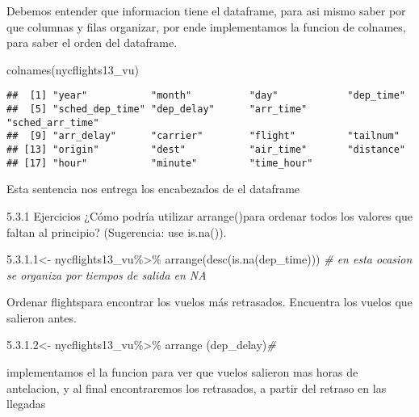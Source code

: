 \documentclass[
]{article}
\newenvironment{Shaded}{\begin{snugshade}}{\end{snugshade}}
\newcommand{\CommentTok}[1]{\textcolor[rgb]{0.56,0.35,0.01}{\textit{#1}}}
\newcommand{\FunctionTok}[1]{\textcolor[rgb]{0.00,0.00,0.00}{#1}}
\newcommand{\NormalTok}[1]{#1}
\newcommand{\OtherTok}[1]{\textcolor[rgb]{0.56,0.35,0.01}{#1}}
\newcommand{\SpecialCharTok}[1]{\textcolor[rgb]{0.00,0.00,0.00}{#1}}
\newcommand{\StringTok}[1]{\textcolor[rgb]{0.31,0.60,0.02}{#1}}
\begin{document}
Debemos entender que informacion tiene el dataframe, para asi mismo
saber por que columnas y filas organizar, por ende implementamos la
funcion de colnames, para saber el orden del dataframe.

\begin{Shaded}
\begin{Highlighting}[]
\FunctionTok{colnames}\NormalTok{(nycflights13\_vu)}
\end{Highlighting}
\end{Shaded}

\begin{verbatim}
##  [1] "year"           "month"          "day"            "dep_time"      
##  [5] "sched_dep_time" "dep_delay"      "arr_time"       "sched_arr_time"
##  [9] "arr_delay"      "carrier"        "flight"         "tailnum"       
## [13] "origin"         "dest"           "air_time"       "distance"      
## [17] "hour"           "minute"         "time_hour"
\end{verbatim}

Esta sentencia nos entrega los encabezados de el dataframe

5.3.1 Ejercicios ¿Cómo podría utilizar arrange()para ordenar todos los
valores que faltan al principio? (Sugerencia: use is.na()).

\begin{Shaded}
\begin{Highlighting}[]
\StringTok{\textquotesingle{}5.3.1.1\textquotesingle{}}\OtherTok{\textless{}{-}}\NormalTok{ nycflights13\_vu}\SpecialCharTok{\%\textgreater{}\%}
\FunctionTok{arrange}\NormalTok{(}\FunctionTok{desc}\NormalTok{(}\FunctionTok{is.na}\NormalTok{(dep\_time))) }\CommentTok{\# en esta ocasion se organiza por tiempos de salida en NA}
\end{Highlighting}
\end{Shaded}

Ordenar flightspara encontrar los vuelos más retrasados. Encuentra los
vuelos que salieron antes.

\begin{Shaded}
\begin{Highlighting}[]
\StringTok{\textquotesingle{}5.3.1.2\textquotesingle{}}\OtherTok{\textless{}{-}}\NormalTok{ nycflights13\_vu}\SpecialCharTok{\%\textgreater{}\%}
\FunctionTok{arrange}\NormalTok{ (dep\_delay)}\CommentTok{\# }
\end{Highlighting}
\end{Shaded}

implementamos el la funcion para ver que vuelos salieron mas horas de
antelacion, y al final encontraremos los retrasados, a partir del
retraso en las llegadas
\end{document}
